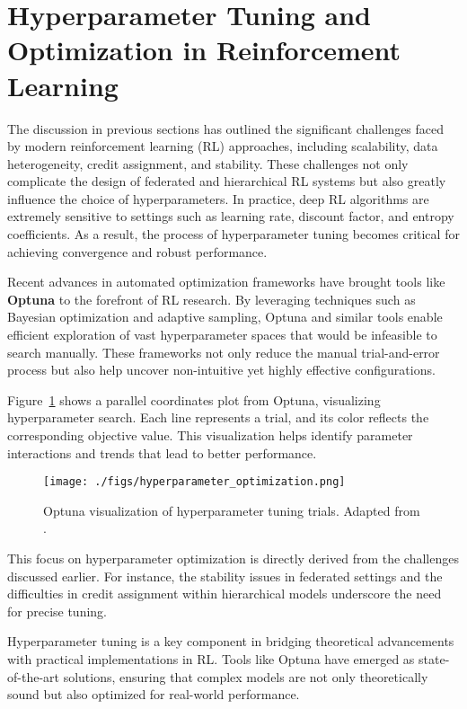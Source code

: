 \documentclass[12pt,a4paper,twoside,openany]{book}
\begin{document}
\section{Hyperparameter Tuning and Optimization in Reinforcement Learning}

The discussion in previous sections has outlined the significant challenges faced by modern reinforcement learning (RL) approaches, including scalability, data heterogeneity, credit assignment, and stability. These challenges not only complicate the design of federated and hierarchical RL systems but also greatly influence the choice of hyperparameters. In practice, deep RL algorithms are extremely sensitive to settings such as learning rate, discount factor, and entropy coefficients. As a result, the process of hyperparameter tuning becomes critical for achieving convergence and robust performance.

Recent advances in automated optimization frameworks have brought tools like \textbf{Optuna} \cite{Optuna} to the forefront of RL research. By leveraging techniques such as Bayesian optimization and adaptive sampling, Optuna and similar tools enable efficient exploration of vast hyperparameter spaces that would be infeasible to search manually. These frameworks not only reduce the manual trial-and-error process but also help uncover non-intuitive yet highly effective configurations.

Figure~\ref{fig:hyperparameter_optimization} shows a parallel coordinates plot from Optuna, visualizing hyperparameter search. Each line represents a trial, and its color reflects the corresponding objective value. This visualization helps identify parameter interactions and trends that lead to better performance.

\begin{figure}[h]
\centering
\texttt{[image: ./figs/hyperparameter\_optimization.png]}
\captionsetup{font=small}
\caption{Optuna visualization of hyperparameter tuning trials. Adapted from \cite{Optuna}.}
\label{fig:hyperparameter_optimization}
\end{figure}

This focus on hyperparameter optimization is directly derived from the challenges discussed earlier. For instance, the stability issues in federated settings and the difficulties in credit assignment within hierarchical models underscore the need for precise tuning.

Hyperparameter tuning is a key component in bridging theoretical advancements with practical implementations in RL. Tools like Optuna have emerged as state-of-the-art solutions, ensuring that complex models are not only theoretically sound but also optimized for real-world performance.
\end{document}
